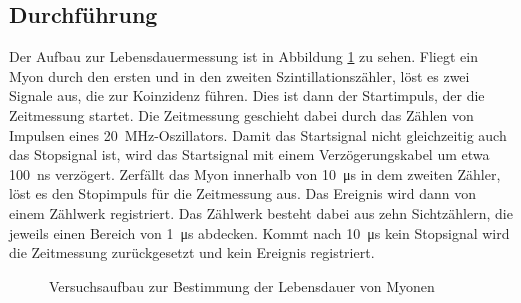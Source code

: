 \subsection{Durchführung}
Der Aufbau zur Lebensdauermessung ist in Abbildung \ref{fig:lebensdauer_aufbau} zu sehen. Fliegt ein Myon durch den ersten und in den zweiten Szintillationszähler, löst es zwei Signale aus, die zur Koinzidenz führen. Dies ist dann der Startimpuls, der die Zeitmessung startet. Die Zeitmessung geschieht dabei durch das Zählen von Impulsen eines \SI{20}{\mega\hertz}-Oszillators. Damit das Startsignal nicht gleichzeitig auch das Stopsignal ist, wird das Startsignal mit einem Verzögerungskabel um etwa \SI{100}{\nano\second} verzögert. Zerfällt das Myon innerhalb von \SI{10}{\micro\second} in dem zweiten Zähler, löst es den Stopimpuls für die Zeitmessung aus. Das Ereignis wird dann von einem Zählwerk registriert. Das Zählwerk besteht dabei aus zehn Sichtzählern, die jeweils einen Bereich von \SI{1}{\micro\second} abdecken. Kommt nach \SI{10}{\micro\second} kein Stopsignal wird die Zeitmessung zurückgesetzt und kein Ereignis registriert. \\

\begin{figure}[h]
  \centering
  \caption{Versuchsaufbau zur Bestimmung der Lebensdauer von Myonen}
  \label{fig:lebensdauer_aufbau}
\end{figure}

